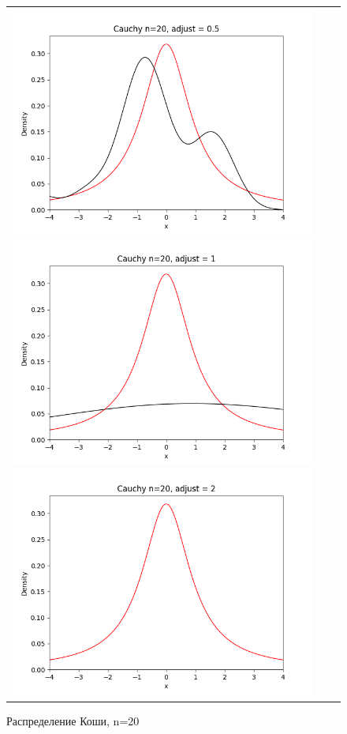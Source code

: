 \begin{figure}[H]
	\begin{tabular}{ccc}
		\includegraphics[scale=0.33]{cauchy_n20_adjust0.5.png}
		\includegraphics[scale=0.33]{cauchy_n20_adjust1.png}
		\includegraphics[scale=0.33]{cauchy_n20_adjust2.png}
	\end{tabular}
	\caption{Распределение Коши, n=20}
\end{figure}

